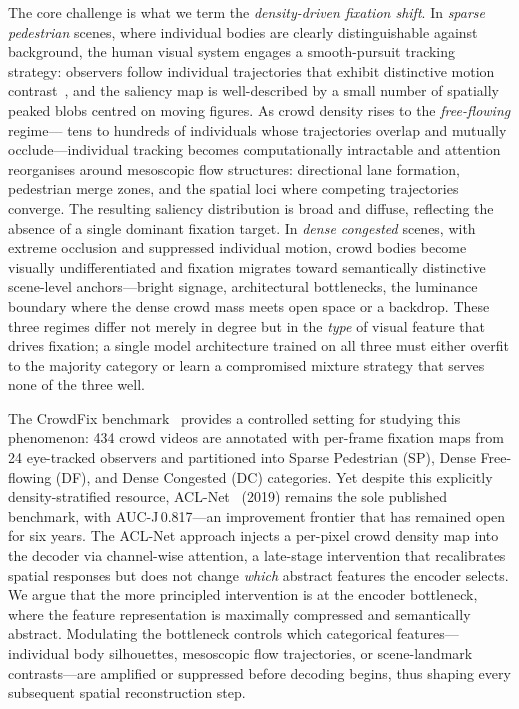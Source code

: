 \documentclass[twocolumn]{article}
\begin{document}
The core challenge is what we term the \emph{density-driven fixation shift}.
In \emph{sparse pedestrian} scenes, where individual bodies are clearly
distinguishable against background, the human visual system engages a
smooth-pursuit tracking strategy: observers follow individual trajectories
that exhibit distinctive motion contrast~\citep{helbing}, and the saliency
map is well-described by a small number of spatially peaked blobs centred on
moving figures.  As crowd density rises to the \emph{free-flowing} regime---
tens to hundreds of individuals whose trajectories overlap and mutually
occlude---individual tracking becomes computationally intractable and
attention reorganises around mesoscopic flow structures: directional lane
formation, pedestrian merge zones, and the spatial loci where competing
trajectories converge.  The resulting saliency distribution is broad and
diffuse, reflecting the absence of a single dominant fixation target.  In
\emph{dense congested} scenes, with extreme occlusion and suppressed
individual motion, crowd bodies become visually undifferentiated and fixation
migrates toward semantically distinctive scene-level anchors---bright signage,
architectural bottlenecks, the luminance boundary where the dense crowd mass
meets open space or a backdrop.  These three regimes differ not merely in
degree but in the \emph{type} of visual feature that drives fixation; a
single model architecture trained on all three must either overfit to the
majority category or learn a compromised mixture strategy that serves none
of the three well.

The CrowdFix benchmark~\citep{crowdfix} provides a controlled setting for
studying this phenomenon: 434 crowd videos are annotated with per-frame
fixation maps from 24 eye-tracked observers and partitioned into Sparse
Pedestrian (SP), Dense Free-flowing (DF), and Dense Congested (DC)
categories.  Yet despite this explicitly density-stratified resource,
ACL-Net~\citep{aclnet} (2019) remains the sole published benchmark, with
AUC-J\,0.817---an improvement frontier that has remained open for six years.
The ACL-Net approach injects a per-pixel crowd density map into the decoder
via channel-wise attention, a late-stage intervention that recalibrates
spatial responses but does not change \emph{which} abstract features the
encoder selects.  We argue that the more principled intervention is at the
encoder bottleneck, where the feature representation is maximally compressed
and semantically abstract.  Modulating the bottleneck controls which
categorical features---individual body silhouettes, mesoscopic flow
trajectories, or scene-landmark contrasts---are amplified or suppressed
before decoding begins, thus shaping every subsequent spatial reconstruction
step.
\end{document}
